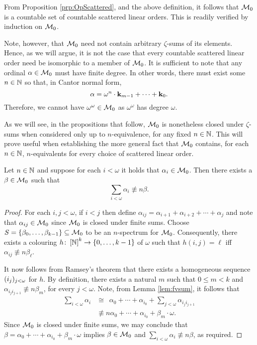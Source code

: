 From Proposition \ref{prp:OpScattered}, and the above definition, it follows
that $\mathcal{M}_0$ is a countable set of countable scattered linear orders.  This is
readily verified by induction on $\mathcal{M}_0$.

Note, however, that $\mathcal{M}_0$ need not contain arbitrary $\zeta$-sums of its
elements.  Hence, as we will argue, it is not the case that every countable
scattered linear order need be isomorphic to a member of $\mathcal{M}_0$.  It is
sufficient to note that any ordinal $\alpha\in\mathcal{M}_0$ must have finite degree.
In other words, there must exist some $n\in\mathbb{N}$ so that, in Cantor normal
form,
\begin{equation}
	\alpha=\omega^n\cdot\mathbf{k}_{m-1}+\dotsb+\mathbf{k}_0.
\end{equation}
Therefore, we cannot have $\omega^\omega\in\mathcal{M}_0$ as $\omega^\omega$ has degree
$\omega$.

As we will see, in the propositions that follow, $\mathcal{M}_0$ is nonetheless closed
under $\zeta$-sums when considered only up to $n$-equivalence, for any fixed
$n\in\mathbb{N}$.  This will prove useful when establishing the more general fact
that $\mathcal{M}_0$ contains, for each $n\in\mathbb{N}$, $n$-equivalents for every choice
of scattered linear order.

\begin{prp}\label{prp:M0sum}
	Let $n\in\mathbb{N}$ and suppose for each $i<\omega$ it holds that
	$\alpha_i\in\mathcal{M}_0$.  Then there exists a $\beta\in\mathcal{M}_0$ such that
	\begin{equation}
		\sum_{i<\omega}\alpha_i\nequiv{n}\beta.
	\end{equation}
\end{prp}
\begin{proof}
	For each $i,j<\omega$, if $i<j$ then define
	$\alpha_{ij}=\alpha_{i+1}+\alpha_{i+2}+\dotsb+\alpha_j$ and note that
	$\alpha_{ij}\in\mathcal{M}_0$ since $\mathcal{M}_0$ is closed under finite sums.  Choose
	$S=\left\lbrace \beta_0,\dotsc,\beta_{k-1}\right\rbrace\subseteq\mathcal{M}_0$ to be an $n$-spectrum
	for $\mathcal{M}_0$.  Consequently, there exists a colouring
	$h\colon\left[\mathbb{N}\right]^{k}\to\left\lbrace 0,\dotsc,k-1\right\rbrace$ of $\omega$ such that
	$h(i,j)=\ell$ iff $\alpha_{ij}\nequiv{n}\beta_\ell$.

	It now follows from Ramsey's theorem that there exists a homogeneous
	sequence $(i_j)_{j<\omega}$ for $h$.  By definition, there exists a
	natural $m$ such that $0\leq m<k$ and
	$\alpha_{i_ji_{j+1}}\nequiv{n}\beta_m$, for every $j<\omega$.  Note, from
	Lemma \ref{lem:fvsum}, it follows that
	\begin{align}
		\sum_{i<\omega}\alpha_i&\cong\phantom{^n}\alpha_0+\dotsb+\alpha_{i_0}
		+\sum_{j<\omega}\alpha_{i_ji_{j+1}}\\
		&\nequiv{n}\alpha_0+\dotsb+\alpha_{i_0}+\beta_m\cdot\omega.
	\end{align}
	Since $\mathcal{M}_0$ is closed under finite sums, we may conclude that
	$\beta=\alpha_0+\dotsb+\alpha_{i_0}+\beta_m\cdot\omega$ implies
	$\beta\in\mathcal{M}_0$ and $\sum_{i<\omega}\alpha_i\nequiv{n}\beta$, as required.
\end{proof}

